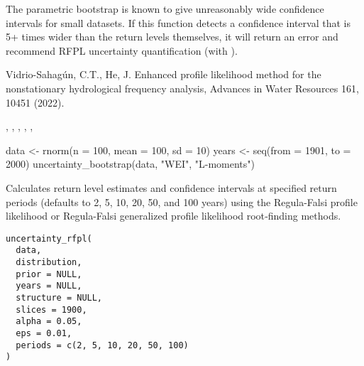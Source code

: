 \documentclass[a4paper]{book}
\begin{document}
%
\begin{Note}
The parametric bootstrap is known to give unreasonably wide confidence intervals
for small datasets. If this function detects a confidence interval that is 5+ times
wider than the return levels themselves, it will return an error and recommend
RFPL uncertainty quantification (with ).
\end{Note}
%
\begin{References}
Vidrio-Sahagún, C.T., He, J. Enhanced profile likelihood method for the nonstationary
hydrological frequency analysis, Advances in Water Resources 161, 10451 (2022).
\end{References}
%
\begin{SeeAlso}
, , ,
, , 
\end{SeeAlso}
%
\begin{Examples}
\begin{ExampleCode}
data <- rnorm(n = 100, mean = 100, sd = 10)
years <- seq(from = 1901, to = 2000)
uncertainty_bootstrap(data, "WEI", "L-moments")

\end{ExampleCode}
\end{Examples}
%
\begin{Description}
Calculates return level estimates and confidence intervals at specified return
periods (defaults to 2, 5, 10, 20, 50, and 100 years) using the Regula-Falsi profile
likelihood or Regula-Falsi generalized profile likelihood root‐finding methods.
\end{Description}
%
\begin{Usage}
\begin{verbatim}
uncertainty_rfpl(
  data,
  distribution,
  prior = NULL,
  years = NULL,
  structure = NULL,
  slices = 1900,
  alpha = 0.05,
  eps = 0.01,
  periods = c(2, 5, 10, 20, 50, 100)
)
\end{verbatim}
\end{Usage}
%
\end{document}
